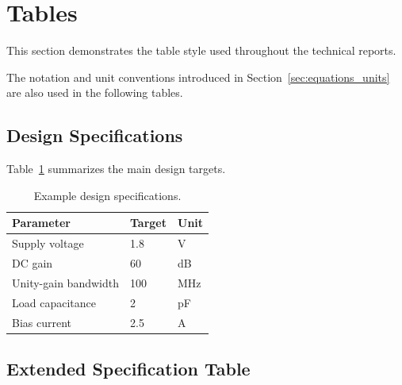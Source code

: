 
\section{Tables}

This section demonstrates the table style used throughout
the technical reports.

The notation and unit conventions introduced in
Section~\ref{sec:equations_units} are also used in the following tables.

\subsection{Design Specifications}

Table~\ref{tab:specifications} summarizes the main design targets.

\begin{table}[htbp]
	\centering
	
	\caption{Example design specifications.}
	\label{tab:specifications}
	
	\begin{tabular}{lll}
		\toprule
		Parameter & Target & Unit \\
		\midrule
		Supply voltage      & 1.8  & V   \\
		DC gain             & 60   & dB  \\
		Unity-gain bandwidth & 100  & MHz \\
		Load capacitance    & 2    & pF  \\
		Bias current        & 2.5  & \textmu A \\
		\bottomrule
	\end{tabular}
	
\end{table}

\subsection{Extended Specification Table}

